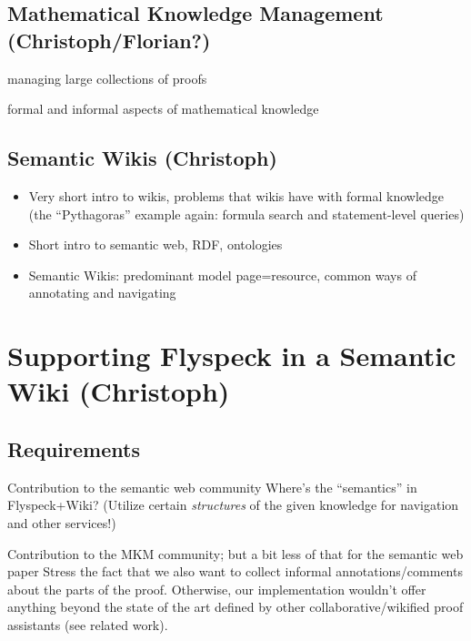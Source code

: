 \documentclass{llncs}
\begin{document}

\subsection{Mathematical Knowledge Management (Christoph/Florian?)}
\label{sec:mkm}

managing large collections of proofs

formal and informal aspects of mathematical knowledge


\subsection{Semantic Wikis (Christoph)}
\label{sec:semwiki}

\begin{itemize}
\item Very short intro to wikis, problems that wikis have with formal knowledge (the
  ``Pythagoras'' example again: formula search and statement-level queries)
\item Short intro to semantic web, RDF, ontologies
\item Semantic Wikis: predominant model page=resource, common ways of annotating and
  navigating
\end{itemize}

\section{Supporting Flyspeck in a Semantic Wiki (Christoph)}

\subsection{Requirements}
\label{sec:req}


\begin{todo}[Christoph]{Contribution to the semantic web community}
  Where's the ``semantics'' in Flyspeck+Wiki? (Utilize certain \emph{structures} of the
  given knowledge for navigation and other services!)
\end{todo}

\begin{todo}{Contribution to the MKM community; but a bit less of that
    for the semantic web paper}
  Stress the fact that we also want to collect informal annotations/comments about the
  parts of the proof.  Otherwise, our implementation wouldn't offer anything beyond the
  state of the art defined by other collaborative/wikified proof assistants (see related
  work).
\end{todo}
\end{document}
